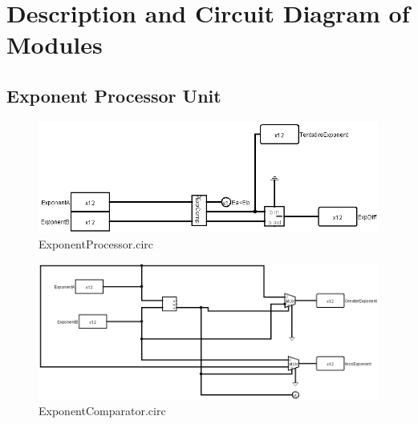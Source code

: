 \documentclass[18pt]{article}
\begin{document}
\section{Description and Circuit Diagram of Modules}
\subsection{Exponent Processor Unit}
\begin{figure}[!h]
    \centering
    \captionsetup{font=Large}
    \includegraphics[scale=0.5]{Util/ExponentProcessor.png}
    \caption{ExponentProcessor.circ}
\end{figure}
\begin{figure}[!h]
    \centering
    \captionsetup{font=Large}
    \includegraphics[scale=0.2]{Util/ExponentComparator.png}
    \caption{ExponentComparator.circ}
\end{figure}
\end{document}
